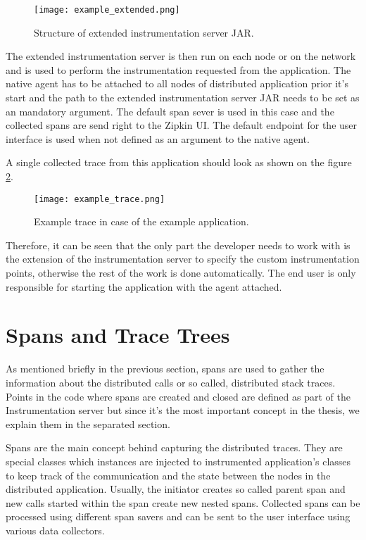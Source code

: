 	\begin{figure}
		\centering
		\texttt{[image: example\_extended.png]}
		\caption{Structure of extended instrumentation server JAR.}
		\label{fig:example_extended}
	\end{figure}

The extended instrumentation server is then run on each node or on the network and is used to perform the instrumentation requested from the application. The native agent has to be attached to all nodes of distributed application prior it's start and the path to the extended instrumentation server JAR needs to be set as an mandatory argument. The default span sever is used in this case and the collected spans are send right to the Zipkin UI. The default endpoint for the user interface is used when not defined as an argument to the native agent. 

A single collected trace from this application should look as shown on the figure \ref{fig:example_trace}.

	\begin{figure}
		\centering
		\texttt{[image: example\_trace.png]}
		\caption{Example trace in case of the example application.}
		\label{fig:example_trace}
	\end{figure}

Therefore, it can be seen that the only part the developer needs to work with is the extension of the instrumentation server to specify the custom instrumentation points, otherwise the rest of the work is done automatically. The end user is only responsible for starting the application with the agent attached.

\section{Spans and Trace Trees}
\label{subsec:spans}
As mentioned briefly in the previous section, spans are used to gather the information about the distributed calls or so called, distributed stack traces. Points in the code where spans are created and closed are defined as part of the Instrumentation server but since it's the most important concept in the thesis, we explain them in the separated section. 

Spans are the main concept behind capturing the distributed traces. They are special classes which instances are injected to instrumented application's classes to keep track of the communication and the state between the nodes in the distributed application. Usually, the initiator creates so called parent span and new calls started within the span create new nested spans. Collected spans can be processed using different span savers and can be sent to the user interface using various data collectors.

